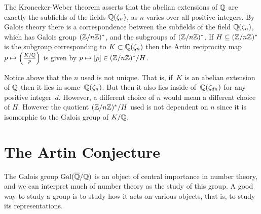 The Kronecker-Weber theorem asserts that the abelian extensions of
$\mathbb{Q}$ are exactly the subfields of the fields $\mathbb{Q}(\zeta_n)$, as $n$
varies over all positive integers.  By Galois theory there is a
correspondence between the subfields of the field $\mathbb{Q}(\zeta_n)$,
which has Galois group $(\mathbb{Z}/n\mathbb{Z})^*$, and the subgroups of $(\mathbb{Z}/n\mathbb{Z})^*$.
If $H \subseteq (\mathbb{Z}/n\mathbb{Z})^*$ is the subgroup corresponding to
$K \subset \mathbb{Q}(\zeta_n)$ then the Artin reciprocity map
$p\mapsto \left(\frac{K/\mathbb{Q}}{p}\right)$ is given by $p\mapsto [p]\in (\mathbb{Z}/n\mathbb{Z})^*/H$.

\begin{remark}
	Notice above that the $n$ used is not unique. That is,
	if~$K$ is an abelian extension of $\mathbb{Q}$ then it lies in some~$\mathbb{Q}(\zeta_n)$.
	But then it also lies inside of~$\mathbb{Q}(\zeta_{dn})$ for any
	positive integer~$d$. However, a different choice of $n$
	would mean a different choice of $H$. However the
	quotient $(\mathbb{Z}/n\mathbb{Z})^*/H$ used is not dependent on $n$
	since it is isomorphic to the Galois group of $K/\mathbb{Q}$.
\end{remark}

\section{The Artin Conjecture}\label{sec:artin}

The Galois group $\operatorname{Gal}(\overline{\mathbb{Q}}/\mathbb{Q})$ is an object of central importance
in number theory, and we can interpret much of number theory as the
study of this group.  A good way to study a group is to study how it
acts on various objects, that is, to study its representations.

